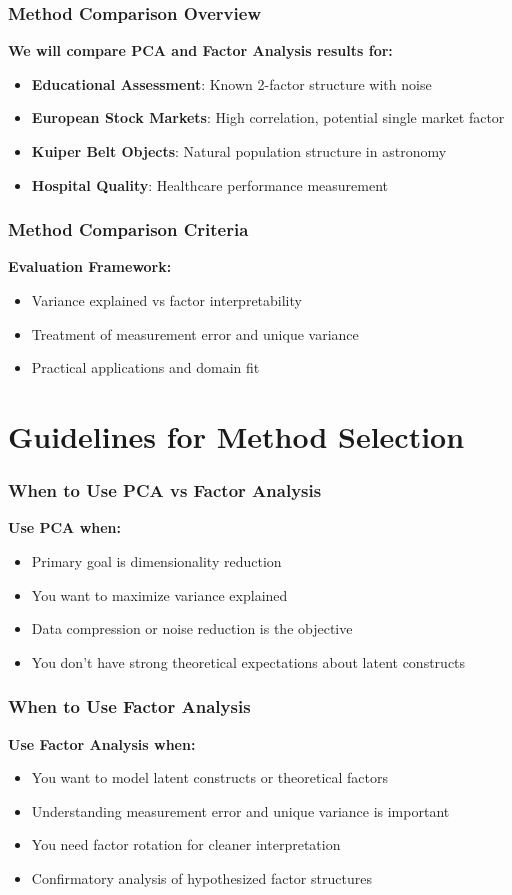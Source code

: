\documentclass[aspectratio=169]{beamer}
\begin{document}
\begin{frame}
    \frametitle{Method Comparison Overview}
    \textbf{We will compare PCA and Factor Analysis results for:}
    \begin{itemize}
        \item \textbf{Educational Assessment}: Known 2-factor structure with noise
        \item \textbf{European Stock Markets}: High correlation, potential single market factor  
        \item \textbf{Kuiper Belt Objects}: Natural population structure in astronomy
        \item \textbf{Hospital Quality}: Healthcare performance measurement
    \end{itemize}
\end{frame}

\begin{frame}
    \frametitle{Method Comparison Criteria}
    \textbf{Evaluation Framework:}
    \begin{itemize}
        \item Variance explained vs factor interpretability
        \item Treatment of measurement error and unique variance
        \item Practical applications and domain fit
    \end{itemize}
\end{frame}

\section{Guidelines for Method Selection}

\begin{frame}
    \frametitle{When to Use PCA vs Factor Analysis}
    \textbf{Use PCA when:}
    \begin{itemize}
        \item Primary goal is dimensionality reduction \pause
        \item You want to maximize variance explained \pause
        \item Data compression or noise reduction is the objective \pause
        \item You don't have strong theoretical expectations about latent constructs \pause
    \end{itemize}
\end{frame}

\begin{frame}
    \frametitle{When to Use Factor Analysis}
    \textbf{Use Factor Analysis when:}
    \begin{itemize}
        \item You want to model latent constructs or theoretical factors \pause
        \item Understanding measurement error and unique variance is important \pause
        \item You need factor rotation for cleaner interpretation \pause
        \item Confirmatory analysis of hypothesized factor structures \pause
    \end{itemize}
\end{frame}
\end{document}
